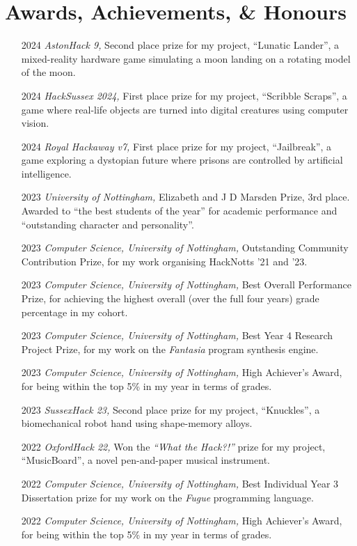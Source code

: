 \documentclass[12pt]{article}
\begin{document}
\section*{Awards, Achievements, \& Honours}
\begin{itemize}
	\item[2024] \textit{AstonHack 9,} Second place prize for my project, ``Lunatic Lander'', a mixed-reality hardware game simulating a moon landing on a rotating model of the moon.
	\item[2024] \textit{HackSussex 2024,} First place prize for my project, ``Scribble Scraps'', a game where real-life objects are turned into digital creatures using computer vision.
	\item[2024] \textit{Royal Hackaway v7,} First place prize for my project, ``Jailbreak'', a game exploring a dystopian future where prisons are controlled by artificial intelligence.
	\item[2023] \textit{University of Nottingham,} Elizabeth and J D Marsden Prize, 3rd place. Awarded to ``the best students of the year'' for academic performance and ``outstanding character and personality''.
	\item[2023] \textit{Computer Science, University of Nottingham,} Outstanding Community Contribution Prize, for my work organising HackNotts '21 and '23.
	\item[2023] \textit{Computer Science, University of Nottingham,} Best Overall Performance Prize, for achieving the highest overall (over the full four years) grade percentage in my cohort.
	\item[2023] \textit{Computer Science, University of Nottingham,} Best Year 4 Research Project Prize, for my work on the \textit{Fantasia} program synthesis engine.
	\item[2023] \textit{Computer Science, University of Nottingham,} High Achiever's Award, for being within the top 5\% in my year in terms of grades.
	\item[2023] \textit{SussexHack 23,} Second place prize for my project, ``Knuckles'', a biomechanical robot hand using shape-memory alloys.
	\item[2022] \textit{OxfordHack 22,} Won the \textit{``What the Hack?!''} prize for my project, ``MusicBoard'', a novel pen-and-paper musical instrument.
	\item[2022] \textit{Computer Science, University of Nottingham,} Best Individual Year 3 Dissertation prize for my work on the \textit{Fugue} programming language.
	\item[2022] \textit{Computer Science, University of Nottingham,} High Achiever's Award, for being within the top 5\% in my year in terms of grades.

\end{itemize}
\end{document}
